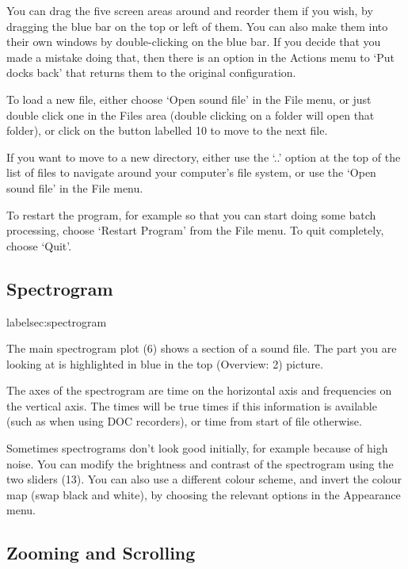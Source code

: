 \documentclass{article}
\begin{document}
You can drag the five screen areas around and reorder them if you wish, by dragging the blue bar on the top or left of them. You can also make them into their own windows by double-clicking on the blue bar. If you decide that you made a mistake doing that, then there is an option in the Actions menu to `Put docks back' that returns them to the original configuration.

To load a new file, either choose `Open sound file' in the File menu, or just double click one in the Files area (double clicking on a folder will open that folder), or click on the button labelled 10 to move to the next file.

If you want to move to a new directory, either use the `..' option at the top of the list of files to navigate around your computer's file system, or use the  `Open sound file' in the File menu.

To restart the program, for example so that you can start doing some batch processing, choose `Restart Program' from the File menu. To quit completely, choose `Quit'. 


\subsection{Spectrogram}label{sec:spectrogram}

The main spectrogram plot (6) shows a section of a sound file. The part you are looking at is highlighted in blue in the top (Overview: 2) picture.

The axes of the spectrogram are time on the horizontal axis and frequencies on the vertical axis. The times will be true times if this information is available (such as when using DOC recorders), or time from start of file otherwise. 

Sometimes spectrograms don't look good initially, for example because of high noise. You can modify the brightness and contrast of the spectrogram using the two sliders (13). You can also use a different colour scheme, and invert the colour map (swap black and white), by choosing the relevant options in the Appearance menu.

\subsection{Zooming and Scrolling}
\end{document}
